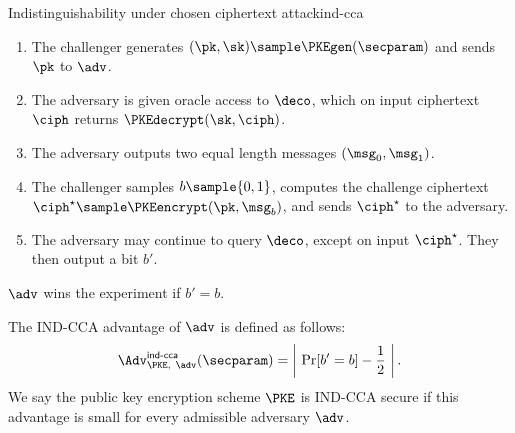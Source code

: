 \begin{experimentbox}{Indistinguishability under chosen ciphertext
  attack}{ind-cca}

  \begin{enumerate}

    \item The challenger generates $(\pk, \sk) \sample \PKEgen(\secparam)$ and
      sends $\pk$ to $\adv$.

    \item The adversary is given oracle access to $\deco$, which on input
      ciphertext $\ciph$ returns $\PKEdecrypt(\sk,\ciph)$.

    \item The adversary outputs two equal length messages $(\msg_0,\msg_1)$.

    \item The challenger samples $b \sample \{0,1\}$, computes the challenge
      ciphertext $\ciph^\star \sample \PKEencrypt(\pk,\msg_b)$, and sends
      $\ciph^\star$ to the adversary.

    \item The adversary may continue to query $\deco$, except on input
      $\ciph^\star$. They then output a bit $b'$.

  \end{enumerate}

  $\adv$ wins the experiment if $b' = b$.

\end{experimentbox}

The IND-CCA advantage of $\adv$ is defined as follows:
%
\begin{equation*}
%
  \Adv^{\mathsf{ind\text{-}cca}}_{\PKE, \ \adv}(\secparam) = \left| \
  \Pr[b'=b] - \frac{1}{2} \ \right|.
%
\end{equation*}
%
We say the public key encryption scheme $\PKE$ is IND-CCA secure if this
advantage is small for every admissible adversary $\adv$.